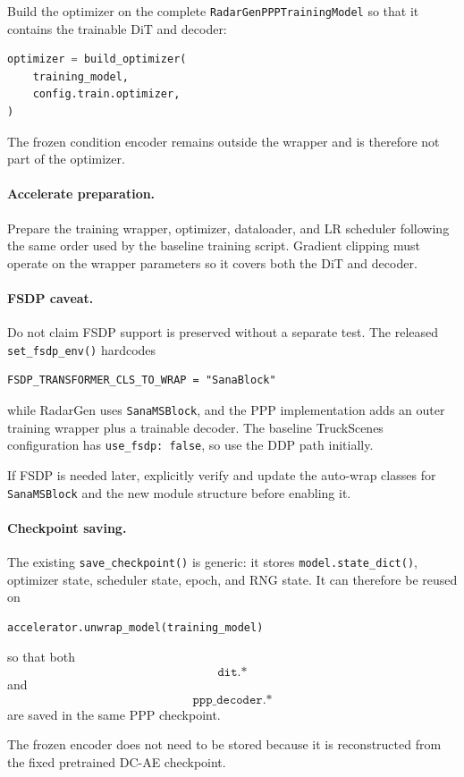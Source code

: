 \documentclass[11pt,a4paper]{article}
\begin{document}
Build the optimizer on the complete \texttt{RadarGenPPPTrainingModel} so that it contains the trainable DiT and decoder:
\begin{lstlisting}[language=Python]
optimizer = build_optimizer(
    training_model,
    config.train.optimizer,
)
\end{lstlisting}

The frozen condition encoder remains outside the wrapper and is therefore not part of the optimizer.

\paragraph{Accelerate preparation.}
Prepare the training wrapper, optimizer, dataloader, and LR scheduler following the same order used by the baseline training script. Gradient clipping must operate on the wrapper parameters so it covers both the DiT and decoder.

\paragraph{FSDP caveat.}
Do not claim FSDP support is preserved without a separate test. The released \texttt{set\_fsdp\_env()} hardcodes
\begin{lstlisting}
FSDP_TRANSFORMER_CLS_TO_WRAP = "SanaBlock"
\end{lstlisting}
while RadarGen uses \texttt{SanaMSBlock}, and the PPP implementation adds an outer training wrapper plus a trainable decoder. The baseline TruckScenes configuration has \texttt{use\_fsdp: false}, so use the DDP path initially.

If FSDP is needed later, explicitly verify and update the auto-wrap classes for \texttt{SanaMSBlock} and the new module structure before enabling it.

\paragraph{Checkpoint saving.}
The existing \texttt{save\_checkpoint()} is generic: it stores \texttt{model.state\_dict()}, optimizer state, scheduler state, epoch, and RNG state. It can therefore be reused on
\begin{lstlisting}[language=Python]
accelerator.unwrap_model(training_model)
\end{lstlisting}
so that both
\[
    \texttt{dit.*}
\]
and
\[
    \texttt{ppp\_decoder.*}
\]
are saved in the same PPP checkpoint.

The frozen encoder does not need to be stored because it is reconstructed from the fixed pretrained DC-AE checkpoint.
\end{document}
